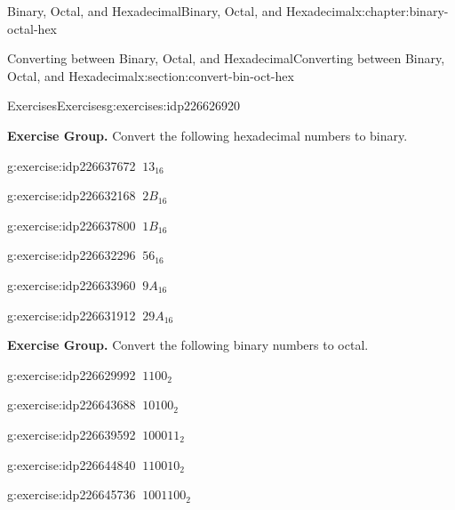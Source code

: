 \documentclass[twoside,10pt,]{book}
\numberwithin{equation}{section}
\begin{document}
\begin{chapterptx}{Binary, Octal, and Hexadecimal}{}{Binary, Octal, and Hexadecimal}{}{}{x:chapter:binary-octal-hex}
\begin{sectionptx}{Converting between Binary, Octal, and Hexadecimal}{}{Converting between Binary, Octal, and Hexadecimal}{}{}{x:section:convert-bin-oct-hex}
\begin{exercises-subsection}{Exercises}{}{Exercises}{}{}{g:exercises:idp226626920}
\begin{exercisegroup}
\end{exercisegroup}
\par\medskip\noindent
\par\medskip\noindent%
\textbf{Exercise Group.}\space\space%
Convert the following hexadecimal numbers to binary.\begin{exercisegroup}
\begin{divisionexerciseeg}{7}{}{}{g:exercise:idp226637672}%
\(\ 13_{16}\)\end{divisionexerciseeg}%
\begin{divisionexerciseeg}{8}{}{}{g:exercise:idp226632168}%
\(\ 2B_{16}\)\end{divisionexerciseeg}%
\begin{divisionexerciseeg}{9}{}{}{g:exercise:idp226637800}%
\(\ 1B_{16}\)\end{divisionexerciseeg}%
\begin{divisionexerciseeg}{10}{}{}{g:exercise:idp226632296}%
\(\ 56_{16}\)\end{divisionexerciseeg}%
\begin{divisionexerciseeg}{11}{}{}{g:exercise:idp226633960}%
\(\ 9A_{16}\)\end{divisionexerciseeg}%
\begin{divisionexerciseeg}{12}{}{}{g:exercise:idp226631912}%
\(\ 29A_{16}\)\end{divisionexerciseeg}%
\end{exercisegroup}
\par\medskip\noindent
\par\medskip\noindent%
\textbf{Exercise Group.}\space\space%
Convert the following binary numbers to octal.\begin{exercisegroup}
\begin{divisionexerciseeg}{13}{}{}{g:exercise:idp226629992}%
\(\ 1100_2\)\end{divisionexerciseeg}%
\begin{divisionexerciseeg}{14}{}{}{g:exercise:idp226643688}%
\(\ 10100_2\)\end{divisionexerciseeg}%
\begin{divisionexerciseeg}{15}{}{}{g:exercise:idp226639592}%
\(\ 100011_2\)\end{divisionexerciseeg}%
\begin{divisionexerciseeg}{16}{}{}{g:exercise:idp226644840}%
\(\ 110010_2\)\end{divisionexerciseeg}%
\begin{divisionexerciseeg}{17}{}{}{g:exercise:idp226645736}%
\(\ 1001100_2\)\end{divisionexerciseeg}%

\end{exercisegroup}
\end{exercises-subsection}
\end{sectionptx}
\end{chapterptx}
\end{document}
